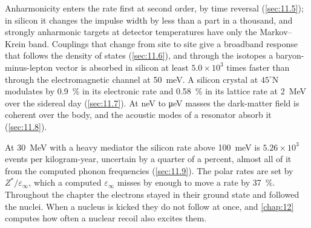 Anharmonicity enters the rate first at second order, by time reversal (\cref{sec:11.5}); in silicon it changes the impulse width by less than a part in a thousand, and strongly anharmonic targets at detector temperatures have only the Markov--Krein band. Couplings that change from site to site give a broadband response that follows the density of states (\cref{sec:11.6}), and through the isotopes a baryon-minus-lepton vector is absorbed in silicon at least $5.0\times10^3$ times faster than through the electromagnetic channel at \SI{50}{meV}. A silicon crystal at $45^\circ$N modulates by \SI{0.9}{\percent} in its electronic rate and \SI{0.58}{\percent} in its lattice rate at \SI{2}{MeV} over the sidereal day (\cref{sec:11.7}). At neV to \si{\micro eV} masses the dark-matter field is coherent over the body, and the acoustic modes of a resonator absorb it (\cref{sec:11.8}).

At \SI{30}{MeV} with a heavy mediator the silicon rate above \SI{100}{meV} is $5.26\times10^3$ events per kilogram-year, uncertain by a quarter of a percent, almost all of it from the computed phonon frequencies (\cref{sec:11.9}). The polar rates are set by $Z^*/\varepsilon_\infty$, which a computed $\varepsilon_\infty$ misses by enough to move a rate by \SI{37}{\percent}. Throughout the chapter the electrons stayed in their ground state and followed the nuclei. When a nucleus is kicked they do not follow at once, and \cref{chap:12} computes how often a nuclear recoil also excites them.
